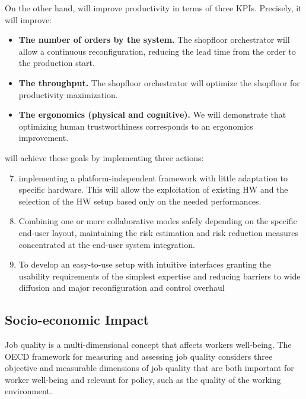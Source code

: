 On the other hand,  will improve productivity in terms
of three KPIs. Precisely, it will improve:

\begin{itemize}[compact]
\item
  \textbf{The number of orders by the system.} The shopfloor
  orchestrator will allow a continuous reconfiguration, reducing the
  lead time from the order to the production start.
\item
  \textbf{The throughput.} The shopfloor orchestrator will optimize the
  shopfloor for productivity maximization.
\item
  \textbf{The ergonomics (physical and cognitive).} We will demonstrate
  that optimizing human trustworthiness corresponds to an ergonomics
  improvement.
\end{itemize}

 will achieve these goals by implementing three
actions:

\begin{enumerate}[action]
\setcounter{enumi}{6}
\item
  implementing a platform-independent framework with little adaptation
  to specific hardware. This will allow the exploitation of existing HW
  and the selection of the HW setup based only on the needed
  performances.
\item
  Combining one or more collaborative modes safely depending on the
  specific end-user layout, maintaining the risk estimation and risk
  reduction measures concentrated at the end-user system integration.
\item
  To develop an easy-to-use setup with intuitive interfaces granting the
  usability requirements of the simplest expertise and reducing barriers
  to wide diffusion and major reconfiguration and control overhaul
\end{enumerate}

\subsection{Socio-economic Impact}\label{socio-economic-impact}


Job quality is a multi-dimensional concept that affects
workers\textquotesingle{} well-being. The OECD framework for measuring
and assessing job quality considers three objective and measurable
dimensions of job quality that are both important for worker well-being
and relevant for policy, such as the quality of the working environment.

